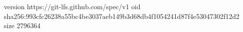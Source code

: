 version https://git-lfs.github.com/spec/v1
oid sha256:993cfc26238a55bc4be3037aeb149b3d68db4f1054241d87f4e53047302f12d2
size 2796364
